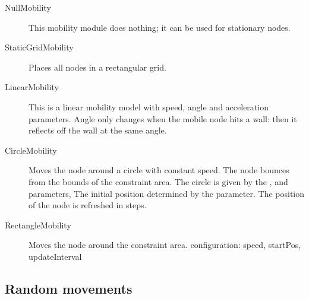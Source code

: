 \begin{description}

\item[NullMobility] This mobility module does nothing;
it can be used for stationary nodes.

\item[StaticGridMobility] Places all nodes in a rectangular grid.


\item[LinearMobility] This is a linear mobility model with speed,
angle and acceleration parameters. Angle only changes when the mobile
node hits a wall: then it reflects off the wall at the same angle.


\item[CircleMobility] Moves the node around a circle with constant speed.
The node bounces from the bounds of the constraint area.
The circle is given by the ,  and  parameters,
The initial position determined by the  parameter.
The position of the node is refreshed in  steps.


\item[RectangleMobility] Moves the node around the constraint area.
configuration: speed, startPos, updateInterval

\end{description}

\subsection{Random movements}

